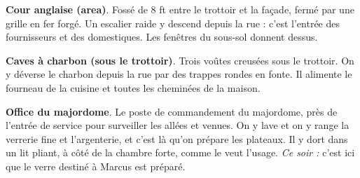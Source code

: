 \documentclass[10pt,a4paper]{article}
\begin{document}
\begin{minipage}[t]{8.75cm}
\end{minipage}\hfill\begin{minipage}[t]{8.95cm}\vspace{0pt}\fontsize{8.4}{10.2}\selectfont
\begin{descr}
\item[\textbf{S1}] \textbf{Cour anglaise (area)}. Fossé de 8 ft entre le trottoir et la façade, fermé par une grille en fer forgé. Un escalier raide y descend depuis la rue : c'est l'entrée des fournisseurs et des domestiques. Les fenêtres du sous-sol donnent dessus.
\item[\textbf{S2}] \textbf{Caves à charbon (sous le trottoir)}. Trois voûtes creusées sous le trottoir. On y déverse le charbon depuis la rue par des trappes rondes en fonte. Il alimente le fourneau de la cuisine et toutes les cheminées de la maison.
\item[\textbf{S3}] \textbf{Office du majordome}. Le poste de commandement du majordome, près de l'entrée de service pour surveiller les allées et venues. On y lave et on y range la verrerie fine et l'argenterie, et c'est là qu'on prépare les plateaux. Il y dort dans un lit pliant, à côté de la chambre forte, comme le veut l'usage. \textit{Ce soir :} c'est ici que le verre destiné à Marcus est préparé.

\end{descr}
\end{minipage}
\end{document}

